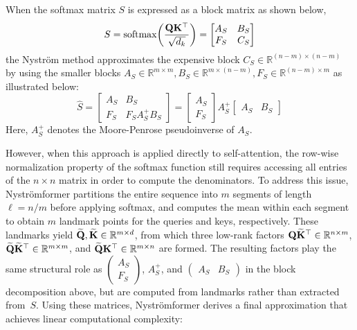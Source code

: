 \documentclass[runningheads]{llncs}
\begin{document}
When the softmax matrix $S$ is expressed as a block matrix as shown below,
\[
    S = {\mathrm{softmax}}\!\left(\frac{{\mathbf{Q}}{\mathbf{K}}^\top}{\sqrt{d_k}}\right) = \begin{bmatrix} A_S & B_S \\ F_S & C_S \end{bmatrix}
\]
the Nystr\"om method approximates the expensive block $C_S \in \mathbb{R}^{(n-m)\times (n-m)}$ by using the smaller blocks $A_S \in \mathbb{R}^{m \times m}, B_S \in \mathbb{R}^{m \times (n-m)}, F_S \in \mathbb{R}^{(n-m)\times m}$ as illustrated below:
\[
    \hat S = \begin{bmatrix}
            A_S & B_S \\
            F_S & F_S A_S^{+} B_S
            \end{bmatrix} =
            \begin{bmatrix}
            A_S \\
            F_S
            \end{bmatrix}
            A_S^{+}
            \begin{bmatrix}
            A_S & B_S
            \end{bmatrix}
\]
Here, $A_S^+$ denotes the Moore-Penrose pseudoinverse of $A_S$.

However, when this approach is applied directly to self-attention, the row-wise normalization property of the softmax function still requires accessing all entries of the $n \times n$ matrix in order to compute the denominators. To address this issue, Nystr\"omformer partitions the entire sequence into $m$ segments of length $\ell = n/m$ before applying softmax, and computes the mean within each segment to obtain $m$ landmark points for the queries and keys, respectively. These landmarks yield $\widetilde{{\mathbf{Q}}}, \widetilde{{\mathbf{K}}} \in \mathbb{R}^{m \times d}$, from which three low-rank factors ${\mathbf{Q}}\widetilde{{\mathbf{K}}}^\top \in \mathbb{R}^{n \times m}$, $\widetilde{{\mathbf{Q}}}\widetilde{{\mathbf{K}}}^\top \in \mathbb{R}^{m \times m}$, and $\widetilde{{\mathbf{Q}}}{\mathbf{K}}^\top \in \mathbb{R}^{m \times n}$ are formed. The resulting factors play the same structural role as $\begin{pmatrix} A_S \\ F_S \end{pmatrix}$, $A_S^{+}$, and $\begin{pmatrix} A_S & B_S \end{pmatrix}$ in the block decomposition above, but are computed from landmarks rather than extracted from~$S$.
Using these matrices, Nystr\"omformer derives a final approximation that achieves linear computational complexity:
\end{document}
